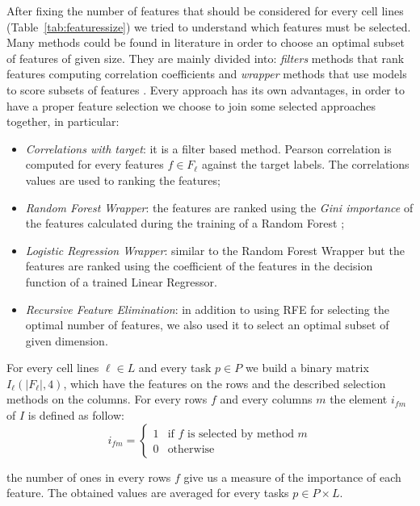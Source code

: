 After fixing the number of features that should be considered for every cell lines (Table~\ref{tab:featuressize}) we tried to understand which features must be selected. Many methods could be found in literature in order to choose an optimal subset of features of given size. They are mainly divided into: \emph{filters} methods that rank features computing correlation coefficients and \emph{wrapper} methods that use models to score subsets of features \cite{Guyon}. Every approach has its own advantages, in order to have a proper feature selection we choose to join some selected approaches together, in particular:
\begin{itemize}
    \item \textit{Correlations with target}: it is a filter based method. Pearson correlation is computed for every features $f \in F_\ell$ against the target labels. The correlations values are used to ranking the features;
    \item \textit{Random Forest Wrapper}: the features are ranked using the \emph{Gini importance} \cite{giniimportance} of the features calculated during the training of a Random Forest \cite{breiman2001random}; 
    \item \textit{Logistic Regression Wrapper}: similar to the Random Forest Wrapper but the features are ranked using the coefficient of the features in the decision function of a trained Linear Regressor.
    \item \emph{Recursive Feature Elimination}: in addition to using RFE for selecting the optimal number of features, we also used it to select an optimal subset of given dimension. 
\end{itemize}
For every cell lines $\ell \in L$ and every task $p \in P$ we build a binary matrix $I_\ell(|F_\ell|, 4)$, which have the features on the rows and the described selection methods on the columns. For every rows $f$ and every columns $m$ the element $i_{fm}$ of $I$ is defined as follow: 
\[
    i_{fm} = \begin{cases} 1 & \mbox{if } f \mbox{ is selected by method } m \\ 0 & \mbox{otherwise} \end{cases}
\]

the number of ones in every rows $f$ give us a measure of the importance of each feature. The obtained values are averaged for every tasks $p \in P \times L$. 

